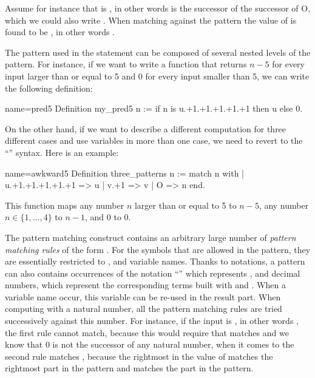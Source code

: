 Assume for instance that  is , in other words  is the
successor of the successor of O, which we could also write
.  When matching  against the pattern 
the value of  is found to be , in other words .

The pattern used in the  statement can be composed of
several nested levels of the  pattern.  For instance,
if we want to write a function
that returns \(n-5\) for every input larger than or equal to 5 and 0
for every input smaller than 5, we can write the following definition:

\begin{coq}{name=pred5}{}
Definition my_pred5 n :=
  if n is u.+1.+1.+1.+1.+1 then u else 0.
\end{coq}
On the other hand, if we want to describe a different computation for
three different cases and use variables in more than one case, we need
to revert to the ``'' syntax.  Here is an
example:

\begin{coq}{name=awkward5}{}
Definition three_patterns n :=
  match n with
  | u.+1.+1.+1.+1.+1 => u
  | v.+1 => v
  | O => n
  end.
\end{coq}
This function maps any number \(n\) larger than or equal to 5 to \(n-5\),
any number \(n \in \{1, \ldots, 4\}\) to \(n-1\), and \(0\) to \(0\).

The pattern matching construct 
contains an arbitrary large number of {\em pattern matching rules} of
the form .  For the symbols that are allowed
in the pattern, they are essentially restricted to ,  and
variable names.  Thanks to notations, a pattern can also contains
occurrences of the notation ``'' which represents , and
decimal numbers, which represent the corresponding terms built with
 and .  When a variable name occur, this variable can be
re-used in the result part.  When computing with a natural number, all
the pattern matching rules are tried successively against this number.
For instance, if the input is , in other words , the first
rule cannot match, because this would require that  matches
 and we know that \(0\) is not the successor of any
natural number, when it comes to the second rule  matches
, because the rightmost  in the value of  matches
the rightmost  part in the pattern and  matches the  part
in the pattern.

